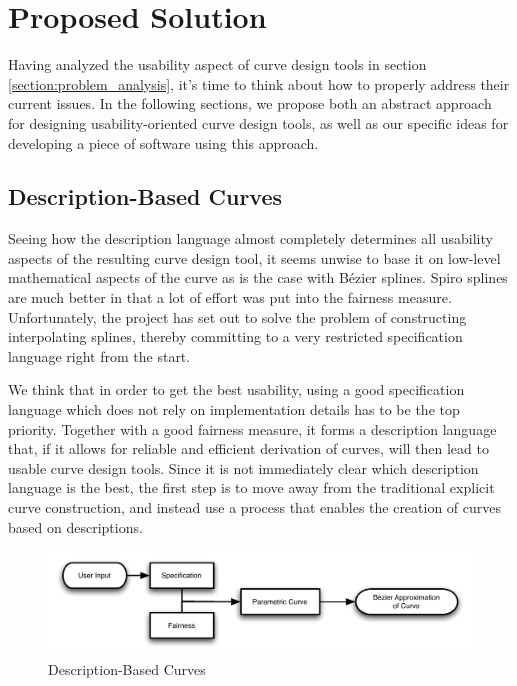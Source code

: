\documentclass[a4paper]{article}
\begin{document}
	\section{Proposed Solution}
	\label{section:proposed_solution}

		Having analyzed the usability aspect of curve design tools in section \ref{section:problem_analysis}, it's time to think about how to properly address their current issues. In the following sections, we propose both an abstract approach for designing usability-oriented curve design tools, as well as our specific ideas for developing a piece of software using this approach.
          
		\subsection{Description-Based Curves}
		\label{section:description-based_curves}

			Seeing how the description language almost completely determines all usability aspects of the resulting curve design tool, it seems unwise to base it on low-level mathematical aspects of the curve as is the case with Bézier splines. Spiro splines are much better in that a lot of effort was put into the fairness measure. Unfortunately, the project has set out to solve the problem of constructing interpolating splines, thereby committing to a very restricted specification language right from the start.

			We think that in order to get the best usability, using a good specification language which does not rely on implementation details has to be the top priority. Together with a good fairness measure, it forms a description language that, if it allows for reliable and efficient derivation of curves, will then lead to usable curve design tools. Since it is not immediately clear which description language is the best, the first step is to move away from the traditional explicit curve construction, and instead use a process that enables the creation of curves based on descriptions.

			\begin{figure}[htb]
				\centering
				\includegraphics[width=\textwidth]{../resources/description-based_curves.pdf}
				\caption{Description-Based Curves}
				\label{figure:description-based_curves}
			\end{figure}
\end{document}
